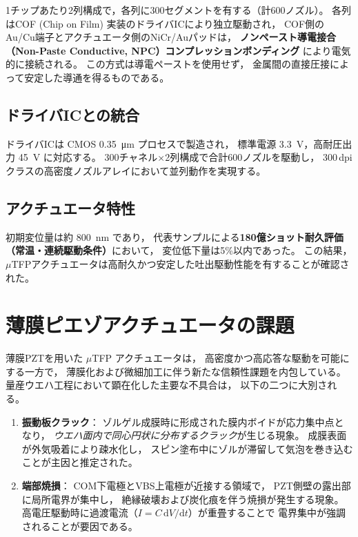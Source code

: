 \documentclass[conference]{IEEEtran}
\begin{document}
1チップあたり2列構成で，各列に300セグメントを有する（計600ノズル）。
各列はCOF (Chip on Film) 実装のドライバICにより独立駆動され，
COF側のAu/Cu端子とアクチュエータ側のNiCr/Auパッドは，
\textbf{ノンペースト導電接合（Non-Paste Conductive, NPC）コンプレッションボンディング}
により電気的に接続される。
この方式は導電ペーストを使用せず，
金属間の直接圧接によって安定した導通を得るものである。

\subsection{ドライバICとの統合}
ドライバICは CMOS \SI{0.35}{\micro\metre} プロセスで製造され，
標準電源 \SI{3.3}{V}，高耐圧出力 \SI{45}{V} に対応する。
300チャネル×2列構成で合計600ノズルを駆動し，
300\,dpiクラスの高密度ノズルアレイにおいて並列動作を実現する。

\subsection{アクチュエータ特性}
初期変位量は約 \SI{800}{nm} であり，
代表サンプルによる\textbf{180億ショット耐久評価（常温・連続駆動条件）}において，
変位低下量は5\%以内であった。
この結果，$\mu$TFPアクチュエータは高耐久かつ安定した吐出駆動性能を有することが確認された。

\section{薄膜ピエゾアクチュエータの課題}
薄膜PZTを用いた $\mu$TFP アクチュエータは，
高密度かつ高応答な駆動を可能にする一方で，
薄膜化および微細加工に伴う新たな信頼性課題を内包している。
量産ウエハ工程において顕在化した主要な不具合は，
以下の二つに大別される。

\begin{enumerate}
  \item \textbf{振動板クラック}：  
  ゾルゲル成膜時に形成された膜内ボイドが応力集中点となり，
  \emph{ウエハ面内で同心円状に分布するクラック}が生じる現象。  
  成膜表面が外気吸着により疎水化し，
  スピン塗布中にゾルが滞留して気泡を巻き込むことが主因と推定された。
  \item \textbf{端部焼損}：  
  COM下電極とVBS上電極が近接する領域で，
  PZT側壁の露出部に局所電界が集中し，
  絶縁破壊および炭化痕を伴う焼損が発生する現象。  
  高電圧駆動時に過渡電流（$I = C\,\mathrm{d}V/\mathrm{d}t$）が重畳することで
  電界集中が強調されることが要因である。
\end{enumerate}
\end{document}
